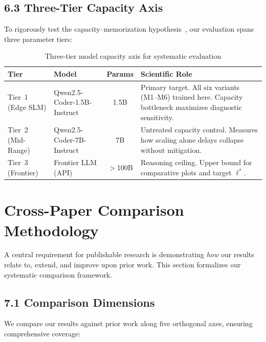 \documentclass[12pt, a4paper]{article}
\begin{document}
\subsection{6.3 Three-Tier Capacity Axis}

To rigorously test the capacity--memorization hypothesis~\cite{too_big_to_think}, our evaluation spans three parameter tiers:

\begin{table}[ht!]
\centering
\caption{Three-tier model capacity axis for systematic evaluation}
\label{tab:capacity_tiers}
\renewcommand{\arraystretch}{1.3}
{\small
\begin{tabularx}{\textwidth}{l l c X}
\toprule
\textbf{Tier} & \textbf{Model} & \textbf{Params} & \textbf{Scientific Role} \\
\midrule
Tier~1 (Edge SLM) & Qwen2.5-Coder-1.5B-Instruct & 1.5B & Primary target. All six variants (M1--M6) trained here. Capacity bottleneck maximizes diagnostic sensitivity. \\
Tier~2 (Mid-Range) & Qwen2.5-Coder-7B-Instruct & 7B & Untreated capacity control. Measures how scaling alone delays collapse without mitigation. \\
Tier~3 (Frontier) & Frontier LLM (API) & $>$100B & Reasoning ceiling. Upper bound for comparative plots and target $\ell^*$. \\
\bottomrule
\end{tabularx}
}
\end{table}

\section{Cross-Paper Comparison Methodology}

A central requirement for publishable research is demonstrating \emph{how} our results relate to, extend, and improve upon prior work. This section formalizes our systematic comparison framework.

\subsection{7.1 Comparison Dimensions}

We compare our results against prior work along five orthogonal axes, ensuring comprehensive coverage:
\end{document}
